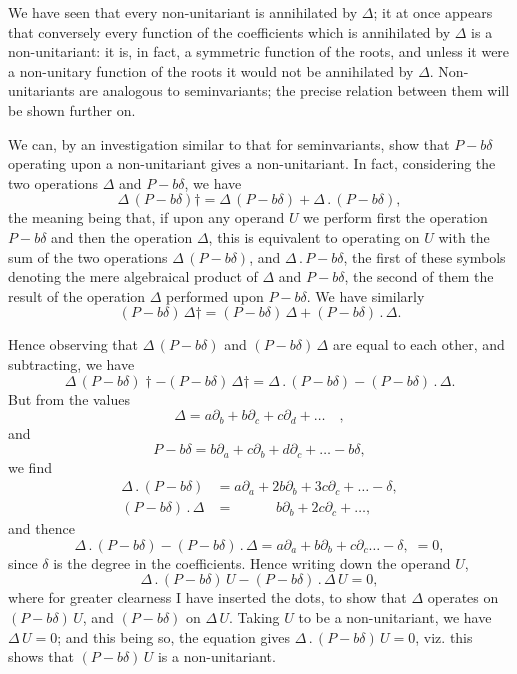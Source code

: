 \documentclass[11pt,a4paper]{book}
\begin{document}
{{{\begin{art}
We have seen that every non-unitariant is annihilated by $\Delta$; it at once appears that conversely every function of the coefficients which is annihilated by $\Delta$ is a non-unitariant: it is, in fact, a symmetric function of the roots, and unless it were a non-unitary function of the roots it would not be annihilated by $\Delta$. Non-unitariants are analogous to seminvariants; the precise relation between them will be shown further on.
\end{art}

\setcounter{art}{26}
\begin{art}
We can, by an investigation similar to that for seminvariants, show that $P - b\delta$ operating upon a non-unitariant gives a non-unitariant. In fact, considering the two operations $\Delta$ and $P - b\delta$, we have
\[
\Delta\,(P - b\delta)\dagger = \Delta\,(P - b\delta) + \Delta\,.\,(P - b\delta),
\]
the meaning being that, if upon any operand $U$ we perform first the operation $P - b\delta$ and then the operation $\Delta$, this is equivalent to operating on $U$ with the sum of the two operations $\Delta\,(P - b\delta)$, and $\Delta\,.\,P - b\delta$, the first of these symbols denoting the mere algebraical product of $\Delta$ and $P - b\delta$, the second of them the result of the operation $\Delta$ performed upon $P - b\delta$. We have similarly
\[
(P - b\delta)\,\Delta\dagger = (P - b\delta)\,\Delta + (P - b\delta)\,.\,\Delta.
\]

Hence observing that $\Delta\,(P - b\delta)$ and $(P - b\delta)\,\Delta$ are equal to each other, and subtracting, we have
\[
\Delta\,(P - b\delta)\dagger - (P - b\delta)\,\Delta\dagger = \Delta\,.\,(P - b\delta) - (P - b\delta)\,.\,\Delta.
\]
But from the values
\[
\Delta = a\partial_{b} + b\partial_{c} + c\partial_{d} + \ldots\quad,
\]
and
\[
P - b\delta = b\partial_{a} + c\partial_{b} + d\partial_{c} + \ldots - b\delta,
\]
we find
\begin{align*}
\Delta\,.\,(P - b\delta) &= a\partial_{a} + 2b\partial_{b} + 3c\partial_{c} + \ldots - \delta,\\
(P - b\delta)\,.\,\Delta &= \phantom{a\partial_{a} +}\; b\partial_{b} + 2c\partial_{c} + \ldots,
\end{align*}
and thence
\[
\Delta\,.\,(P - b\delta) - (P - b\delta)\,.\,\Delta = a\partial_{a} + b\partial_{b} + c\partial_{c} \ldots - \delta,\; = 0,
\]
since $\delta$ is the degree in the coefficients. Hence writing down the operand $U$,
\[
\Delta\,.\,(P - b\delta)\,U - (P - b\delta)\,.\,\Delta\,U = 0,
\]
where for greater clearness I have inserted the dots, to show that $\Delta$ operates on $(P - b\delta)\,U$, and $(P - b\delta)$ on $\Delta\,U$. Taking $U$ to be a non-unitariant, we have $\Delta\,U = 0$; and this being so, the equation gives $\Delta\,.\,(P - b\delta)\,U = 0$, viz. this shows that $(P - b\delta)\,U$ is a non-unitariant.
\end{art}

}}}
\end{document}
